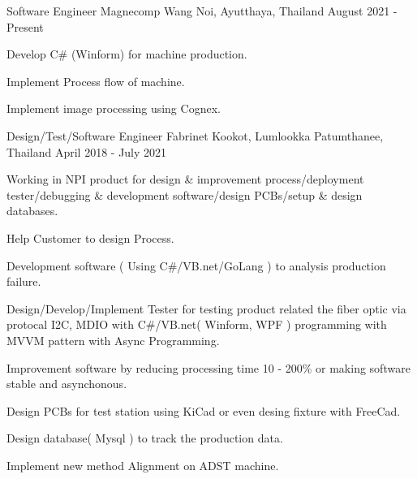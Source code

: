 
\begin{cventries}

  \cventry
    {Software Engineer} %
    {Magnecomp} %
    {Wang Noi, Ayutthaya, Thailand} %
    {August 2021 - Present} %
    {
      \begin{cvitems} %
      \item {Develop C\# (Winform) for machine production.}
        \item {Implement Process flow of machine.}
        \item {Implement image processing using Cognex.}
      \end{cvitems}
    }


  \cventry
    {Design/Test/Software Engineer} %
    {Fabrinet} %
    {Kookot, Lumlookka Patumthanee, Thailand} %
    {April 2018 - July 2021} %
    {
      \begin{cvitems} %
        \item {Working in NPI product for design \& improvement
          process/deployment tester/debugging \& development software/design
          PCBs/setup \& design databases.}
        \item {Help Customer to design Process.}
        \item {Development software ( Using C\#/VB.net/GoLang ) to analysis
          production failure.}
        \item {Design/Develop/Implement Tester for testing product related the fiber optic via
          protocal I2C, MDIO with C\#/VB.net( Winform, WPF ) programming with MVVM
          pattern with Async Programming.}
        \item {Improvement software by reducing processing time 10 -  200\% or making
        software stable and asynchonous.}
        \item {Design PCBs for test station using KiCad or even desing fixture
          with FreeCad.}
        \item {Design database( Mysql ) to track the production data.}
        \item {Implement new method Alignment on ADST machine.}
      \end{cvitems}
    }


\end{cventries}
